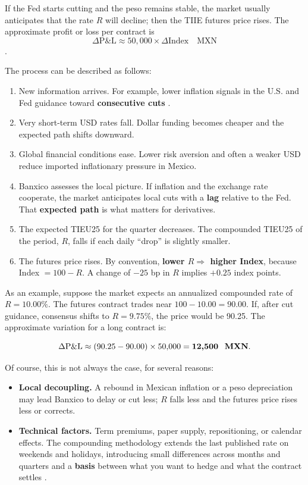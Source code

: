 \documentclass[10pt,a4paper]{article} %
\begin{document}
If the Fed starts cutting and the peso remains stable, the market usually anticipates that the rate $R$ will decline; then the TIIE futures price rises. The approximate profit or loss per contract is 
\[
\Delta \text{P\&L} \approx 50{,}000 \times \Delta \text{Index} \quad \text{MXN}
\]
\citep{banxico2023,cme2025a,cme2025b,reuters2025a}. 

The process can be described as follows:

\begin{enumerate}
    \item New information arrives. For example, lower inflation signals in the U.S. and Fed guidance toward \textbf{consecutive cuts} \citep{reuters2025}.
    \item Very short-term USD rates fall. Dollar funding becomes cheaper and the expected path shifts downward.
    \item Global financial conditions ease. Lower risk aversion and often a weaker USD reduce imported inflationary pressure in Mexico.
    \item Banxico assesses the local picture. If inflation and the exchange rate cooperate, the market anticipates local cuts with a \textbf{lag} relative to the Fed. That \textbf{expected path} is what matters for derivatives.
    \item The expected TIEU25 for the quarter decreases. The compounded TIEU25 of the period, $R$, falls if each daily ``drop'' is slightly smaller.
    \item The futures price rises. By convention, \textbf{lower $R \Rightarrow$ higher Index}, because Index $= 100 - R$. A change of $-25$ bp in $R$ implies $+\!0.25$ index points.
\end{enumerate}

As an example, suppose the market expects an annualized compounded rate of $R = 10.00\%$. The futures contract trades near $100 - 10.00 = 90.00$. If, after cut guidance, consensus shifts to $R = 9.75\%$, the price would be 90.25. The approximate variation for a long contract is:

\[
\Delta \text{P\&L} \approx (90.25 - 90.00)\times 50{,}000 = \textbf{12{,}500 \ \text{MXN}}.
\]

Of course, this is not always the case, for several reasons:

\begin{itemize}
    \item \textbf{Local decoupling.} A rebound in Mexican inflation or a peso depreciation may lead Banxico to delay or cut less; $R$ falls less and the futures price rises less or corrects.
    \item \textbf{Technical factors.} Term premiums, paper supply, repositioning, or calendar effects. The compounding methodology extends the last published rate on weekends and holidays, introducing small differences across months and quarters and a \textbf{basis} between what you want to hedge and what the contract settles \citep{cme2025a,cme2025b}.
\end{itemize}
\end{document}

